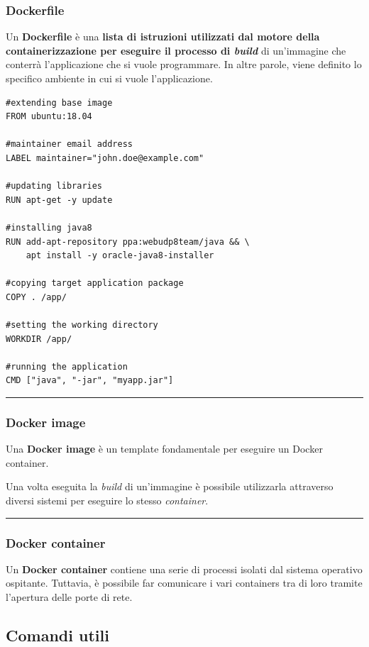 \documentclass[a4paper]{article}
\newcommand{\longline}{\noindent\rule{\textwidth}{0.4pt}}
\begin{document}
	\subsubsection{Dockerfile}
	
	Un \textcolor{Red3}{\textbf{Dockerfile}} è una \textbf{lista di istruzioni utilizzati dal motore della containerizzazione per eseguire il processo di \emph{build}} di un'immagine che conterrà l'applicazione che si vuole programmare.\newline
	In altre parole, viene definito lo specifico ambiente in cui si vuole l'applicazione.
	\begin{lstlisting}
#extending base image
FROM ubuntu:18.04

#maintainer email address
LABEL maintainer="john.doe@example.com"

#updating libraries
RUN apt-get -y update

#installing java8
RUN add-apt-repository ppa:webudp8team/java && \
	apt install -y oracle-java8-installer
	
#copying target application package
COPY . /app/

#setting the working directory
WORKDIR /app/

#running the application
CMD ["java", "-jar", "myapp.jar"]\end{lstlisting}

	\longline
	
	\subsubsection{Docker image}
	
	Una \textcolor{Red3}{\textbf{Docker image}} è un template fondamentale per eseguire un Docker container.
	
	Una volta eseguita la \emph{build} di un'immagine è possibile utilizzarla attraverso diversi sistemi per eseguire lo stesso \emph{container}.
	
	\longline
	
	\subsubsection{Docker container}
	
	Un \textcolor{Red3}{\textbf{Docker container}} contiene una serie di processi isolati dal sistema operativo ospitante. Tuttavia, è possibile far comunicare i vari containers tra di loro tramite l'apertura delle porte di rete.\newpage
	
	\subsection{Comandi utili}
\end{document}
